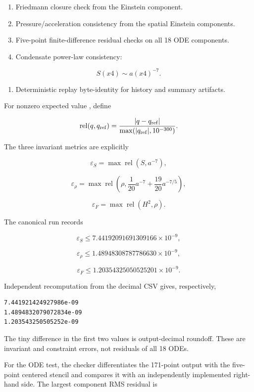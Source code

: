 \documentclass[11pt]{article}
\begin{document}
\begin{enumerate}
\item Friedmann closure check from the \texttt{} Einstein component.
\item Pressure/acceleration consistency from the spatial Einstein components.
\item Five-point finite-difference residual checks on all 18 ODE components.
\item Condensate power-law consistency:
\end{enumerate}

\[
S(x4)\sim a(x4)^{-7}.
\]

\begin{enumerate}
\item Deterministic replay byte-identity for history and summary artifacts.
\end{enumerate}

For nonzero expected value \texttt{}, define

\[
\operatorname{rel}(q,q_{\rm ref})=
\frac{|q-q_{\rm ref}|}{\max(|q_{\rm ref}|,10^{-300})}.
\]

The three invariant metrics are explicitly

\[
\varepsilon_S=\max\operatorname{rel}(S,a^{-7}),
\]

\[
\varepsilon_\rho=\max\operatorname{rel}
\left(\rho,\frac1{20}a^{-7}+\frac{19}{20}a^{-7/5}\right),
\]

\[
\varepsilon_F=\max\operatorname{rel}(H^2,\rho).
\]

The canonical run records

\[
\varepsilon_S\le 7.44192091691309166\times 10^{-9},
\]

\[
\varepsilon_\rho\le 1.48948308787786630\times 10^{-9},
\]

\[
\varepsilon_{F}\le 1.20354325050525201\times 10^{-9}.
\]

Independent recomputation from the decimal CSV gives, respectively,

\begin{Verbatim}[fontsize=\small]
7.441921424927986e-09
1.4894832079072834e-09
1.203543250505252e-09
\end{Verbatim}

The tiny difference in the first two values is output-decimal roundoff. These are invariant and constraint errors, not residuals of all 18 ODEs.

For the ODE test, the checker differentiates the 171-point output with the five-point centered stencil and compares it with an independently implemented right-hand side. The largest component RMS residual is
\end{document}
